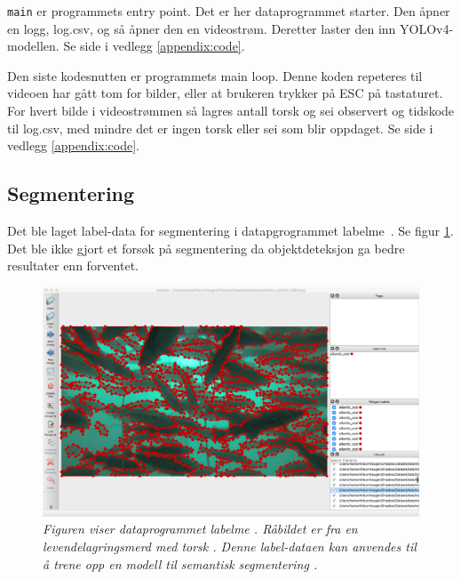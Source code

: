 \texttt{main} er programmets entry point. Det er her dataprogrammet starter. Den åpner en logg, log.csv, og så åpner den en videostrøm. Deretter laster den inn YOLOv4-modellen. Se side \pageref{lst:main} i vedlegg \ref{appendix:code}.

Den siste kodesnutten er programmets main loop. Denne koden repeteres til videoen har gått tom for bilder, eller at brukeren trykker på ESC på tastaturet. For hvert bilde i videostrømmen så lagres antall torsk og sei observert og tidskode til log.csv, med mindre det er ingen torsk eller sei som blir oppdaget. Se side \pageref{lst:mainloop} i vedlegg \ref{appendix:code}.


\subsection{Segmentering}

Det ble laget label-data for segmentering i datapgrogrammet labelme \cite{Wada 2016}. Se figur \ref{fig:labelme}. Det ble ikke gjort et forsøk på segmentering da objektdeteksjon ga bedre resultater enn forventet.

\begin{figure}[h!]
\begin{center} 
\includegraphics[scale=0.25]{figures/labelme}
\caption{\small \sl Figuren viser dataprogrammet labelme \cite{Wada 2016}. Råbildet er fra en levendelagringsmerd med torsk \cite{Nofima 2020}. Denne label-dataen kan anvendes til å trene opp en modell til semantisk segmentering \cite{Shotton m.fl. s. 1}.\label{fig:labelme}} 
\end{center} 
\end{figure} 
